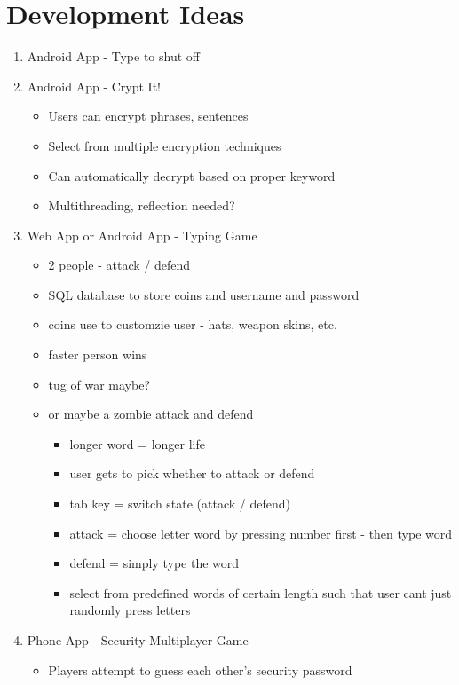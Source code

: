 \documentclass[10pt]{article}
\begin{document}
\section*{Development Ideas}
\begin{enumerate}
    \item Android App - Type to shut off
    \item Android App - Crypt It!
    \begin{itemize}
        \item Users can encrypt phrases, sentences
        \item Select from multiple encryption techniques
        \item Can automatically decrypt based on proper keyword
        \item Multithreading, reflection needed?
    \end{itemize}
    \item Web App or Android App - Typing Game
    \begin{itemize}
        \item 2 people - attack / defend
        \item SQL database to store coins and username and password
        \item coins use to customzie user - hats, weapon skins, etc.
        \item faster person wins
        \item tug of war maybe?
        \item or maybe a zombie attack and defend
        \begin{itemize}
            \item longer word = longer life
            \item user gets to pick whether to attack or defend
            \item tab key = switch state (attack / defend)
            \item attack = choose letter word by pressing number first - then type word
            \item defend = simply type the word
            \item select from predefined words of certain length such that user cant just randomly press letters
        \end{itemize}
    \end{itemize}
    \item Phone App - Security Multiplayer Game
    \begin{itemize}
        \item Players attempt to guess each other's security password

\end{itemize}
\end{enumerate}
\end{document}
